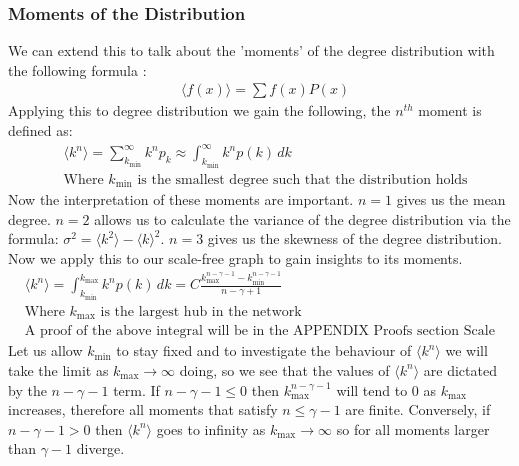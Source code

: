\documentclass{article}
\begin{document}
            \subsubsection{Moments of the Distribution}
                We can extend this to talk about the 'moments' of the degree distribution with the following formula \parencite{papoulis2002probability}:\\
                \begin{align*}
                    &\langle f(x) \rangle = \sum f(x)P(x)
                \end{align*}
                Applying this to degree distribution we gain the following, the $n^{th}$ moment is defined as:\\
                \begin{align*}
                    &\langle k^n \rangle = \sum_{k_{\text{min}}}^{\infty}k^{n}p_{k} \approx \int_{k_{\text{min}}}^{\infty} k^{n}p(k)  \,dk \\
                    &\text{Where $k_{\text{min}}$ is the smallest degree such that the distribution holds}
                \end{align*}
                Now the interpretation of these moments are important. $n=1$ gives us the mean degree. $n=2$ allows us to calculate the variance of the degree distribution via the formula: $\sigma^2 = \langle k^2 \rangle - \langle k\rangle ^2$. $n=3$ gives us the skewness of the degree distribution.
                Now we apply this to our scale-free graph to gain insights to its moments.
                \begin{align*}
                    &\langle k^n \rangle = \int_{k_{\text{min}}}^{k_{\text{max}}}k^{n}p(k) \,dk = C\frac{k^{n-\gamma -1}_{\text{max}}-k^{n-\gamma -1}_{\text{min}}}{n-\gamma +1}\\
                    &\text{Where $k_{\text{max}}$ is the largest hub in the network }\\
                    &\text{A proof of the above integral will be in the APPENDIX Proofs section Scale Free number 2}
                \end{align*}
                Let us allow $k_{\text{min}}$ to stay fixed and to investigate the behaviour of $\langle k^n \rangle$ we will take the limit as $k_\text{max} \to \infty$ doing, so we see that the values of $\langle k^n \rangle$ are dictated by the $n-\gamma -1$ term. If $n-\gamma -1 \leqslant 0$ then $k^{n-\gamma -1}_{\text{max}}$ will tend to $0$ as $k_\text{max}$ increases, therefore all moments that satisfy $n\leqslant \gamma-1$ are finite. Conversely, if  $n-\gamma -1 > 0$  then $\langle k^n \rangle$ goes to infinity as $k_\text{max} \to \infty$ so for all moments larger than $\gamma-1$ diverge.\\ 
\end{document}
